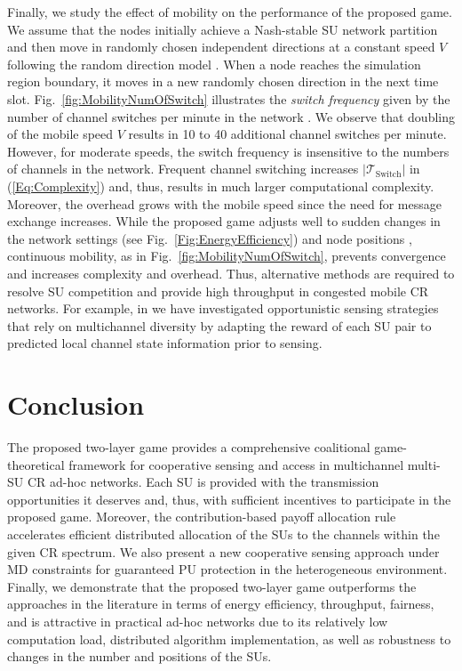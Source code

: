 \documentclass[journal,draftclsnofoot,onecolumn]{IEEEtran}
\theoremstyle{definition}
\begin{document}
Finally, we study the effect of mobility on the performance of the proposed game. We assume that the nodes initially achieve a Nash-stable SU network partition and then move in randomly chosen independent directions at a constant speed $V$ following the random direction model \cite{MobilityModel}. When a node reaches the simulation region boundary, it moves in a new randomly chosen direction in the next time slot. Fig.~\ref{fig:MobilityNumOfSwitch} illustrates the \textit{switch frequency} given by the number of channel switches per minute in the network \cite{ZHanCoalSenseGame}. We observe that doubling of the mobile speed $V$ results in 10 to 40 additional channel switches per minute. However, for moderate speeds, the switch frequency is insensitive to the numbers of channels in the network. Frequent channel switching increases $|\mathcal{T}_\textrm{Switch}|$ in (\ref{Eq:Complexity}) and, thus, results in much larger  computational complexity. Moreover, the overhead grows with the mobile speed since the need for message exchange increases. While the proposed game adjusts well to sudden changes in the network settings (see Fig.~\ref{Fig:EnergyEfficiency}) and node positions \cite{YLuThesis}, continuous mobility, as in Fig.~\ref{fig:MobilityNumOfSwitch}, prevents convergence and increases complexity and overhead. Thus, alternative methods are required to resolve SU competition and provide high throughput in congested mobile CR networks. For example, in \cite{YLuTVT,YLuAllerton} we have investigated opportunistic sensing strategies that rely on multichannel diversity by adapting the reward of each SU pair to predicted local channel state information prior to sensing.

\section{Conclusion}\label{Sec:Conclusion}
The proposed two-layer game provides a comprehensive coalitional game-theoretical framework for cooperative sensing and access in multichannel multi-SU CR ad-hoc networks. Each SU is provided with the transmission opportunities it deserves and, thus, with sufficient incentives to participate in the proposed game.	Moreover, the contribution-based payoff allocation rule accelerates efficient distributed allocation of the SUs to the channels within the given CR spectrum. We also present a new cooperative sensing approach under MD constraints for guaranteed PU protection in the heterogeneous environment. Finally, we demonstrate that the proposed two-layer game outperforms the approaches in the literature in terms of energy efficiency, throughput, fairness, and is attractive in practical ad-hoc networks due to its relatively low computation load, distributed algorithm implementation, as well as robustness to changes in the number and positions of the SUs.
\end{document}
